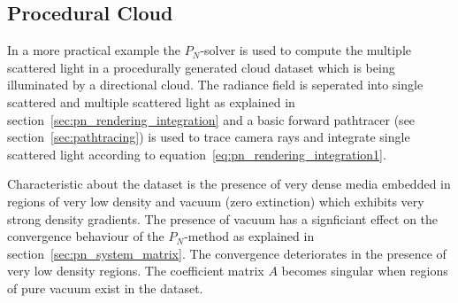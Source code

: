 \subsection{Procedural Cloud}
\label{sec:pn_results_clouds}

In a more practical example the $P_N$-solver is used to compute the multiple scattered light in a procedurally generated cloud dataset which is being illuminated by a directional cloud. The radiance field is seperated into single scattered and multiple scattered light as explained in section~\ref{sec:pn_rendering_integration} and a basic forward pathtracer (see section~\ref{sec:pathtracing}) is used to trace camera rays and integrate single scattered light according to equation~\ref{eq:pn_rendering_integration1}.

Characteristic about the dataset is the presence of very dense media embedded in regions of very low density and vacuum (zero extinction) which exhibits very strong density gradients. The presence of vacuum has a signficiant effect on the convergence behaviour of the $P_N$-method as explained in section~\ref{sec:pn_system_matrix}. The convergence deteriorates in the presence of very low density regions. The coefficient matrix $A$ becomes singular when regions of pure vacuum exist in the dataset.

